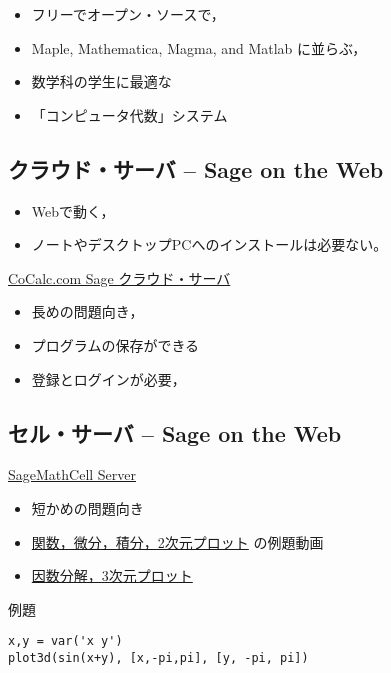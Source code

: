 \documentclass[dvipdfmx,11pt]{jarticle}
\begin{document}
\begin{itemize}
\item フリーでオープン・ソースで，
\item Maple, Mathematica, Magma, and Matlab に並らぶ，
\item 数学科の学生に最適な
\item 「コンピュータ代数」システム
\end{itemize}

\subsection{クラウド・サーバ -- Sage on the Web}
\label{sec:org92bfd0d}

\begin{itemize}
\item Webで動く，
\item ノートやデスクトップPCへのインストールは必要ない。
\end{itemize}

\href{http://www.cocalc.com/}{CoCalc.com Sage クラウド・サーバ} 

\begin{itemize}
\item 長めの問題向き，
\item プログラムの保存ができる
\item 登録とログインが必要，
\end{itemize}

\subsection{セル・サーバ -- Sage on the Web}
\label{sec:org45b7df8}

\href{http://sagecell.sagemath.org/}{SageMathCell Server}

\begin{itemize}
\item 短かめの問題向き

\item \href{http://www.gregorybard.com/videos/Sage\_part1.swf}{関数，微分，積分，2次元プロット} の例題動画

\item \href{http://www.gregorybard.com/videos/Sage\_part2.swf}{因数分解，3次元プロット}
\end{itemize}

例題

\begin{verbatim}
x,y = var('x y')
plot3d(sin(x+y), [x,-pi,pi], [y, -pi, pi])
\end{verbatim}
\end{document}

